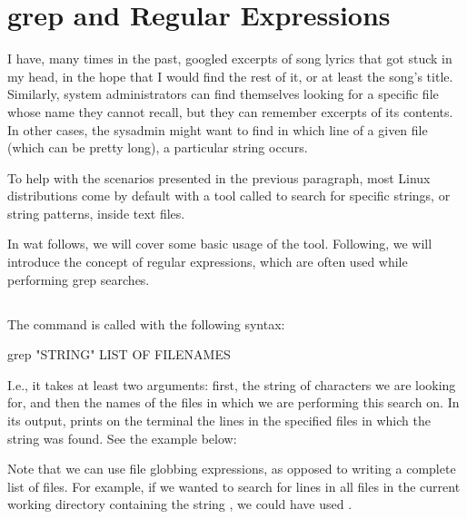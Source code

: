 \chapter{grep and Regular Expressions}\label{ch:grep}

I have, many times in the past, googled excerpts of song lyrics that got stuck in my head, in the hope that I would find the rest of it, or at least the song's title. Similarly, system administrators can find themselves looking for a specific file whose name they cannot recall, but they can remember excerpts of its contents. In other cases, the sysadmin might want to find in which line of a given file (which can be pretty long), a particular string occurs.

To help with the scenarios presented in the previous paragraph, most Linux distributions come by default with a tool called  to search for specific strings, or string patterns, inside text files.

In wat follows, we will cover some basic usage of the  tool. Following, we will introduce the concept of regular expressions, which are often used while performing grep searches.

\section{}

The  command is called with the following syntax:
\begin{command_line}[Bash]
grep "STRING" LIST OF FILENAMES
\end{command_line}
\noindent I.e., it takes at least two arguments: first, the string of characters we are looking for, and then the names of the files in which we are performing this search on. In its output,  prints on the terminal the lines in the specified files in which the string was found. See the example below:
Note that we can use file globbing expressions, as opposed to writing a complete list of files. For example, if we wanted to search for lines in all files in the current working directory containing the string , we could have used .

